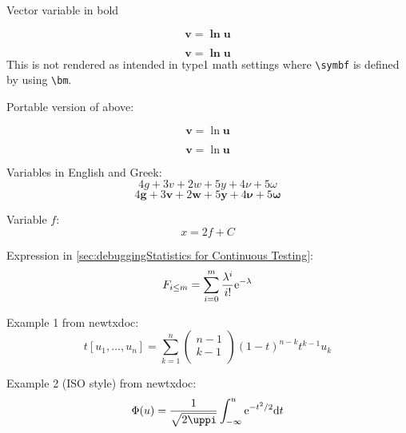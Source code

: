 \item Vector variable in bold
\begin{VerbatimU}[breaklines=true]
\[ \symbf{v = \ln u} \]
\end{VerbatimU}
    \[ \symbf{v = \ln u} \]
    This is not rendered as intended in type1 math settings where
    \verb|\symbf| is defined by using \verb|\bm|.
\item Portable version of above:
\begin{VerbatimU}[breaklines=true]
\[ \symbf v = \ln \symbf u \]
\end{VerbatimU}
    \[ \symbf v = \ln \symbf u \]
\item Variables in English and Greek:
    \[ 4g + 3v + 2w + 5y + 4\nu + 5\omega \]
    \[ 4\symbf g + 3\symbf v + 2\symbf w + 5\symbf y +
       4\symbf\nu + 5\symbf\omega \]
\item Variable $f$:
    \[ x = 2f + C \]
\item Expression in \cref{sec:debuggingStatistics for Continuous Testing}:
    \[ F_{i \le m} = \sum_{i=0}^m \frac{\lambda^i}{i!} \mathrm{e}^{-\lambda} \]
\item Example 1 from newtxdoc:
    \[ t \left[ u_1,\dotsc,u_n \right] =
    \sum_{k=1}^n
    \begin{pmatrix}
	n - 1 \\ k - 1 \\
    \end{pmatrix}
    ( 1 - t )^{n-k} t^{k-1} u_k \]
\item Example 2 (ISO style) from newtxdoc:
    \[ \Phi(u) = \frac{1}{\sqrt{2\uppi}}
    \int_{-\infty}^u \euler^{-t^2 / 2} \mathrm{d}t \]

